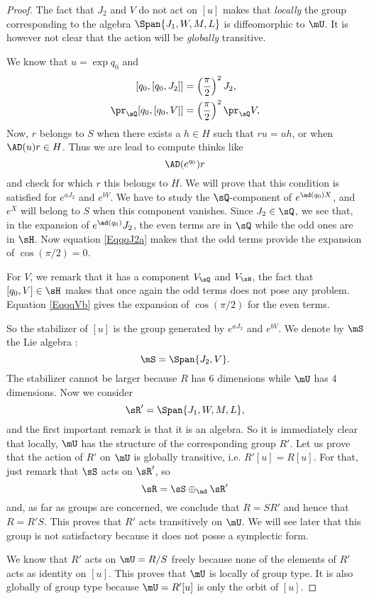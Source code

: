 \begin{proof}
The fact that $J_{2}$ and $V$ do not act on $[u]$ makes that \emph{locally} the group corresponding to the algebra $\Span\{ J_{1},W,M,L \}$ is diffeomorphic to $\mU$. It is however not clear that the action will be \emph{globally} transitive.

We know that $u=\exp q_0$ and
\begin{subequations}
\begin{align}
[q_0,[q_0,J_{2}]]&=\left( \frac{ \pi }{2} \right)^{2}J_{2},			\label{EqqqJ2a} \\
\pr_{\sQ}[q_0,[q_0,V]]&=\left( \frac{ \pi }{2} \right)^{2}\pr_{\sQ}V,		\label{EqqqVb}
\end{align}
\end{subequations}
Now, $r$ belongs to $S$ when there exists a $h\in H$ such that $ru=uh$, or when $\AD(u)r\in H$. Thus we are lead to compute thinks like
\[
  \AD( e^{q_0})r
\]
and check for which $r$ this belongs to $H$. We will prove that this condition is satisfied for $ e^{aJ_{2}}$ and $ e^{bV}$. We have to study the $\sQ$-component of $ e^{\ad(q_0)X}$, and $ e^{X}$ will belong to $S$ when this component vanishes. Since $J_2\in\sQ$, we see that, in the expansion of $ e^{\ad(q_0)}J_2$, the even terms are in $\sQ$ while the odd ones are in $\sH$. Now equation \eqref{EqqqJ2a} makes that the odd terms provide the expansion of $\cos(\pi/2)=0$.

For $V$, we remark that it has a component $V_{\sQ}$ and $V_{\sH}$, the fact that $[q_0,V]\in\sH$ makes that once again the odd terms does not pose any problem. Equation \eqref{EqqqVb} gives the expansion of $\cos(\pi/2)$ for the even terms.

So the stabilizer of $[u]$ is the group generated by $ e^{aJ_2}$ and $ e^{bV}$. We denote by $\mS$ the Lie algebra :
\[ 
  \mS=\Span\{ J_2,V \}.
\]
 The stabilizer cannot be larger because $R$ has $6$ dimensions while $\mU$ has $4$ dimensions. Now we consider 
\[ 
  \sR'=\Span\{ J_1,W,M,L \},
\]
and the first important remark is that it is an algebra. So it is immediately clear that locally, $\mU$ has the structure of the corresponding group $R'$. Let us prove that the action of $R'$ on $\mU$ is globally transitive, i.e. $R'[u]=R[u]$. For that, just remark that $\sS$ acts on $\sR'$, so 
\[ 
  \sR=\sS\oplus_{\ad}\sR'
\]
and, as far as groups are concerned, we conclude that $R=SR'$ and hence that $R=R'S$. This proves that $R'$ acts transitively on $\mU$. We will see later that this group is not satisfactory because it does not posse a symplectic form.

We know that $R'$ acts on $\mU=R/S$ freely because none of the elements of $R'$ acts as identity on $[u]$. This proves that $\mU$ is locally of group type. It is also globally of group type because $\mU=R'[u]$ is only the orbit of $[u]$.

\end{proof}

